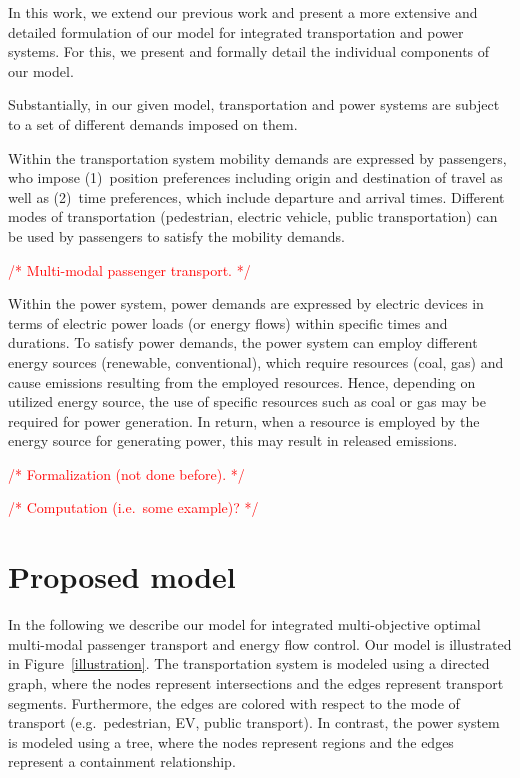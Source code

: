 \documentclass[conference]{IEEEtran}
\newcommand{\todo}[1]{\textcolor{red}{/* #1 */}}
\begin{document}
	In this work, we extend our previous work and present a more extensive and detailed formulation of our model for integrated transportation and power systems. For this, we present and formally detail the individual components of our model.
	
	Substantially, in our given model, transportation and power systems are subject to a set of different demands imposed on them. 
	
	Within the transportation system mobility demands are expressed by passengers, who impose (1)~position preferences including origin and destination of travel as well as (2)~time preferences, which include departure and arrival times. Different modes of transportation (pedestrian, electric vehicle, public transportation) can be used by passengers to satisfy the mobility demands. 
	
	\todo{Multi-modal passenger transport.}
	
	Within the power system, power demands are expressed by electric devices in terms of electric power loads (or energy flows) within specific times and durations. To satisfy power demands, the power system can employ different energy sources (renewable, conventional), which require resources (coal, gas) and cause emissions resulting from the employed resources.
	Hence, depending on utilized energy source, the use of specific resources such as coal or gas may be required for power generation. 
	In return, when a resource is employed by the energy source for generating power, this may result in released emissions. 
	
	\todo{Formalization (not done before).}
	
	\todo{Computation (i.e.\ some example)?}
	
	\section{Proposed model}
	\label{proposed_model}
	
	In the following we describe our model for integrated multi-objective optimal multi-modal passenger transport and energy flow control. Our model is illustrated in Figure~\ref{illustration}. The transportation system is modeled using a directed graph, where the nodes represent intersections and the edges represent transport segments. Furthermore, the edges are colored with respect to the mode of transport (e.g.\ pedestrian, EV, public transport). In contrast, the power system is modeled using a tree, where the nodes represent regions and the edges represent a containment relationship.
	
\end{document}
